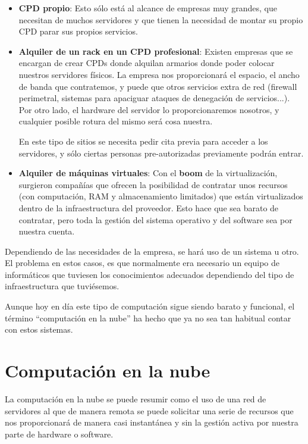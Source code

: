 \begin{itemize}
    \item \textbf{CPD propio}: Esto sólo está al alcance de empresas muy grandes, que necesitan de muchos servidores y que tienen la necesidad de montar su propio CPD parar sus propios servicios.

    \item \textbf{Alquiler de un rack en un CPD profesional}: Existen empresas que se encargan de crear CPDs donde alquilan armarios donde poder colocar nuestros servidores físicos. La empresa nos proporcionará el espacio, el ancho de banda que contratemos, y puede que otros servicios extra de red (firewall perimetral, sistemas para apaciguar ataques de denegación de servicios...). Por otro lado, el hardware del servidor lo proporcionaremos nosotros, y cualquier posible rotura del mismo será cosa nuestra.

    En este tipo de sitios se necesita pedir cita previa para acceder a los servidores, y sólo ciertas personas pre-autorizadas previamente podrán entrar.

    \item \textbf{Alquiler de máquinas virtuales}: Con el \textbf{boom} de la virtualización, surgieron compañías que ofrecen la posibilidad de contratar unos recursos (con computación, RAM y almacenamiento limitados) que están virtualizados dentro de la infraestructura del proveedor. Esto hace que sea barato de contratar, pero toda la gestión del sistema operativo y del software sea por nuestra cuenta.
\end{itemize}


Dependiendo de las necesidades de la empresa, se hará uso de un sistema u otro. El problema en estos casos, es que normalmente era necesario un equipo de informáticos que tuviesen los conocimientos adecuados dependiendo del tipo de infraestructura que tuviésemos.

Aunque hoy en día este tipo de computación sigue siendo barato y funcional, el término “computación en la nube” ha hecho que ya no sea tan habitual contar con estos sistemas.



\chapter{Computación en la nube}

La computación en la nube se puede resumir como el uso de una red de servidores al que de manera remota se puede solicitar una serie de recursos que nos proporcionará de manera casi instantánea y sin la gestión activa por nuestra parte de hardware o software.

